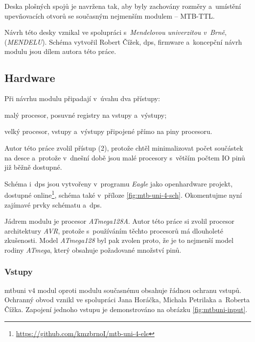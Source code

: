 Deska plošných spojů je navržena tak, aby byly zachovány rozměry a~umístění
upevňovacích otvorů se současným nejmenším modulem – MTB-TTL.

Návrh této desky vznikal ve spolupráci s~\textit{Mendelovou univerzitou
v~Brně}, (\textit{MENDELU}). Schéma vytvořil Robert Čížek, \gls{dps},
firmware a~koncepční návrh modulu jsou dílem autora této práce.


\subsection{Hardware}

Při návrhu modulu připadají v~úvahu dva přístupy:

\begin{compactenum}
\item malý procesor, posuvné registry na vstupy a~výstupy;
\item velký procesor, vstupy a~výstupy připojené přímo na piny procesoru.
\end{compactenum}

Autor této práce zvolil přístup (2), protože chtěl minimalizovat počet
součástek na desce a~protože v~dnešní době jsou malé procesory s~větším počtem
IO pinů již běžně dostupné.

Schéma i~\gls{dps} jsou vytvořeny v~programu \textit{Eagle} jako openhardware
projekt, dostupné
online\footnote{\url{https://github.com/kmzbrnoI/mtb-uni-4-ele}}, schéma také
v~příloze \ref{fig:mtb-uni-4-sch}. Okomentujme nyní zajímavé prvky schématu
a~\gls{dps}.

Jádrem modulu je procesor \textit{ATmega128A}. Autor této práce si zvolil
procesor architektury \textit{AVR}, protože s~používáním těchto procesorů má
dlouholeté zkušenosti. Model \textit{ATmega128} byl pak zvolen proto, že je to
nejmenší model rodiny \textit{ATmega}, který obsahuje požadované množství pinů.

\subsubsection{\textbf{Vstupy}}

\gls{mtbuni} v4 modul oproti modulu současnému obsahuje řádnou ochranu vstupů.
Ochranný obvod vznikl ve spolupráci Jana Horáčka, Michala Petrilaka a~Roberta
Čížka. Zapojení jednoho vstupu je demonstrováno na obrázku \ref{fig:mtbuni-input}.

